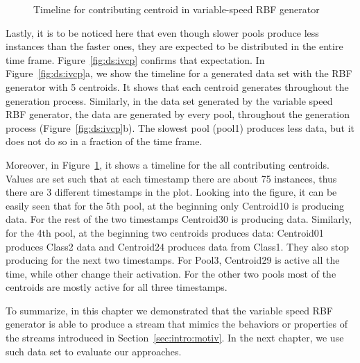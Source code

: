 \begin{figure}[htbp] 
    \begin{center}
        \caption{Timeline for contributing centroid in variable-speed RBF generator}
        \label{fig:ds:ivsc}
    \end{center}
\end{figure}

Lastly, it is to be noticed here that even though slower pools produce less instances than the faster ones, they are expected to be distributed in the entire time frame. Figure~\ref{fig:ds:ivcp} confirms that expectation. In Figure~\ref{fig:ds:ivcp}a, we show the timeline for a generated data set with the RBF generator with 5 centroids. It shows that each centroid generates throughout the generation process. Similarly, in the data set generated by the variable speed RBF generator, the data are generated by every pool, throughout the generation process (Figure~\ref{fig:ds:ivcp}b). The slowest pool (pool1) produces less data, but it does not do so in a fraction of the time frame. 

Moreover, in Figure~\ref{fig:ds:ivsc}, it shows a timeline for the all contributing centroids. Values are set such that at each timestamp there are about 75 instances, thus there are 3 different timestamps in the plot. Looking into the figure, it can be easily seen that for the 5th pool, at the beginning only Centroid10 is producing data. For the rest of the two timestamps Centroid30 is producing data. Similarly, for the 4th pool, at the beginning two centroids produces data: Centroid01 produces Class2 data and Centroid24 produces data from Class1. They also stop producing for the next two timestamps. For Pool3, Centroid29 is active all the time, while other change their activation. For the other two pools most of the centroids are mostly active for all three timestamps.





To summarize, in this chapter we demonstrated that the variable speed RBF generator is able to produce a stream that mimics the behaviors or properties of the streams introduced in Section~\ref{sec:intro:motiv}. In the next chapter, we use such data set to evaluate our approaches.
